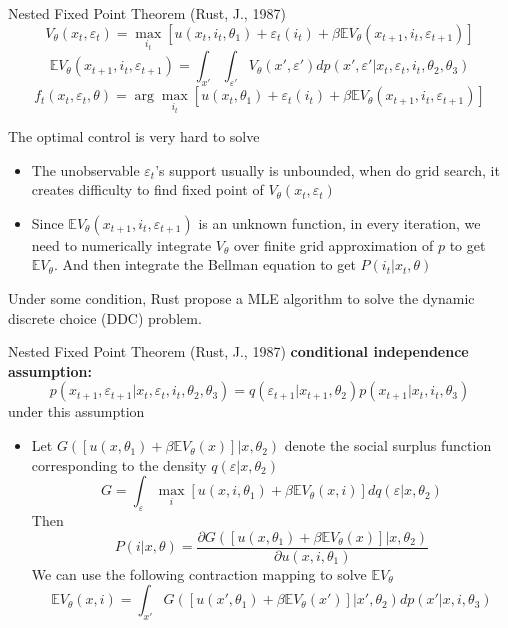 \documentclass[10pt]{beamer}
\begin{document}
\begin{frame}{Nested Fixed Point Theorem (Rust, J., 1987)}
$$V_\theta(x_t,\varepsilon_t) = \max_{i_t}[u(x_t,i_t,\theta_1)+\varepsilon_t(i_t)+\beta\mathbb{E}V_\theta(x_{t+1},i_t,\varepsilon_{t+1})]$$
 $$\mathbb{E}V_\theta(x_{t+1},i_t,\varepsilon_{t+1})=\int_{x'}\int_{\varepsilon'}V_\theta(x',\varepsilon')d p(x',\varepsilon'|x_t,\varepsilon_t,i_t,\theta_2,\theta_3)$$
$$f_t(x_t,\varepsilon_t,\theta) = \arg\max_{i_t}[u(x_t,\theta_1)+\varepsilon_t(i_t)+\beta\mathbb{E}V_\theta(x_{t+1},i_t,\varepsilon_{t+1})]$$

The optimal control is very hard to solve
\begin{itemize}
	\item The unobservable $\varepsilon_t$'s support usually is unbounded, when do grid search, it creates difficulty to find fixed point of $V_\theta(x_t,\varepsilon_t)$
	\item Since $\mathbb{E}V_\theta(x_{t+1},i_t,\varepsilon_{t+1})$ is an unknown function, in every iteration, we need to numerically integrate $V_\theta$ over finite grid approximation of $p$ to get $\mathbb{E}V_\theta$. And then integrate the Bellman equation to get $P(i_t|x_t,\theta)$
\end{itemize}
\bigskip
Under some condition, Rust propose a MLE algorithm to solve the dynamic discrete choice (DDC) problem.
\end{frame}

\begin{frame}{Nested Fixed Point Theorem (Rust, J., 1987)}
\textbf{conditional independence assumption:}
$$p(x_{t+1},\varepsilon_{t+1}|x_t,\varepsilon_t,i_t,\theta_2,\theta_3)=q(\varepsilon_{t+1}|x_{t+1},\theta_2)p(x_{t+1}|x_t,i_t,\theta_3)$$
under this assumption
\begin{itemize}
	\item Let $G([u(x,\theta_1)+\beta\mathbb{E}V_\theta(x)]|x,\theta_2)$ denote the social surplus function corresponding to the density $q(\varepsilon|x,\theta_2)$
	$$G = \int_\varepsilon \max_i [u(x,i,\theta_1)+\beta\mathbb{E}V_\theta(x,i)]dq(\varepsilon|x,\theta_2)$$
	Then 
	$$P(i|x,\theta) = \frac{\partial G([u(x,\theta_1)+\beta\mathbb{E}V_\theta(x)]|x,\theta_2)}{\partial u(x,i,\theta_1)}$$
	We can use the following contraction mapping to solve $\mathbb{E}V_\theta$
	$$\mathbb{E}V_\theta(x,i)=\int_{x'}G([u(x',\theta_1)+\beta\mathbb{E}V_\theta(x')]|x',\theta_2) dp(x'|x,i,\theta_3)$$
	\end{itemize}
\end{frame}
\end{document}
